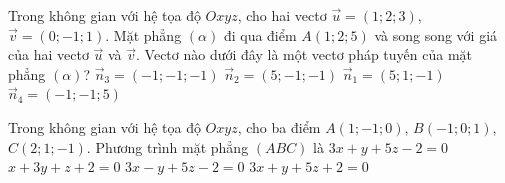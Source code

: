 \begin{ex}%
	Trong không gian với hệ tọa độ $Oxyz$, cho hai vectơ $\overrightarrow{u}=(1;2;3)$, $\overrightarrow{v}=(0;-1;1)$. Mặt phẳng $(\alpha)$ đi qua điểm $A(1;2;5)$ và song song với giá của hai vectơ $\overrightarrow{u}$ và $\overrightarrow{v}$. Vectơ nào dưới đây là một vectơ pháp tuyến của mặt phẳng $(\alpha)$?
	\choice
	{$\overrightarrow{n}_3=(-1;-1;-1)$}
	{\True $\overrightarrow{n}_2=(5;-1;-1)$}
	{$\overrightarrow{n}_1=(5;1;-1)$}
	{$\overrightarrow{n}_4=(-1;-1;5)$}
\end{ex}

\begin{ex}%
	Trong không gian với hệ tọa độ $Oxyz$, cho ba điểm $A(1;-1;0)$, $B(-1;0;1)$, $C(2;1;-1)$. Phương trình mặt phẳng $(ABC)$ là
	\choice
	{\True $3x+y+5z-2=0$}
	{$x+3y+z+2=0$}
	{$3x-y+5z-2=0$}
	{$3x+y+5z+2=0$}
\end{ex}

